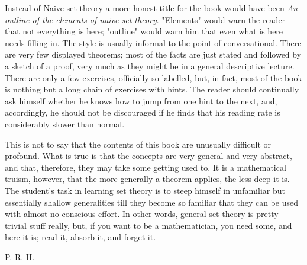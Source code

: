 Instead of Naive set theory a more honest title for the book would have been \textit{An outline of the elements of naive set theory}. "Elements" would warn the reader that not everything is here; "outline" would warn him that even what is here needs filling in. The style is usually informal to the point of conversational. There are very few displayed theorems; most of the facts are just stated and followed by a sketch of a proof, very much as they might be in a general descriptive lecture. There are only a few exercises, officially so labelled, but, in fact, most of the book is nothing but a long chain of exercises with hints. The reader should continually ask himself whether he knows how to jump from one hint to the next, and, accordingly, he should not be discouraged if he finds that his reading rate is considerably slower than normal. 

This is not to say that the contents of this book are unusually difficult or profound. What is true is that the concepts are very general and very abstract, and that, therefore, they may take some getting used to. It is a mathematical truism, however, that the more generally a theorem applies, the less deep it is. The student's task in learning set theory is to steep himself in unfamiliar but essentially shallow generalities till they become so familiar that they can be used with almost no conscious effort. In other words, general set theory is pretty trivial stuff really, but, if you want to be a mathematician, you need some, and here it is; read it, absorb it, and forget it.

\begin{flushright}
P. R. H.
\end{flushright} 